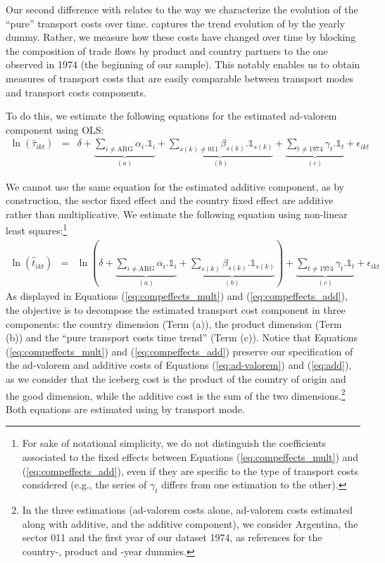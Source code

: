 \documentclass[a4paper,11pt]{article}
\begin{document}
Our second difference with \citet{hummels2007} relates to the way we characterize the evolution of the ``pure'' transport costs over time. \citet{hummels2007} captures the trend evolution of by the yearly dummy. Rather, we measure how these costs have changed over time by blocking the composition of trade flows by product and country partners to the one observed in 1974 (the beginning of our sample). This notably enables us to obtain measures of transport costs that are easily comparable between transport modes and transport costs components.

To do this, we estimate the following equations for the estimated ad-valorem component using OLS:
\begin{eqnarray}
\ln(\widehat{\tau}_{ikt})&=&\delta +\underbrace{\sum_{i \neq \text{ARG}}\alpha_i.\mathbb{1}_i}_{(a)} + \underbrace{\sum_{s(k)\neq \text{011}}\beta_{s(k)}.\mathbb{1}_{s(k)}}_{(b)} + \underbrace{\sum_{t \neq 1974}\gamma_t.\mathbb{1}_t}_{(c)}+\epsilon_{ikt} \label{eq:compeffects_mult}
\end{eqnarray}

We cannot use the same equation for the estimated additive component, as by construction, the sector fixed effect and the country fixed effect are additive rather than multiplicative. We estimate the following equation using non-linear least squares:\footnote{For sake of notational simplicity, we do not distinguish the coefficients associated to the fixed effects between Equations (\ref{eq:compeffects_mult}) and (\ref{eq:compeffects_add}), even if they are specific to the type of transport costs considered (e.g., the series of $\gamma_t$ differs from one estimation to the other).}
\begin{eqnarray}
\ln(\widehat{t}_{ikt})&=&\ln\left( \delta + \underbrace{\sum_{i \neq \text{ARG}}  \alpha_i.\mathbb{1}_i}_{(a)}+\underbrace{\sum_{s(k)}\beta_{s(k)}.\mathbb{1}_{s(k)}}_{(b)}\right) + \underbrace{\sum_{t \neq 1974}\gamma_t.\mathbb{1}_t}_{(c)}+\epsilon_{ikt} \label{eq:compeffects_add}
\end{eqnarray}
As displayed in Equations (\ref{eq:compeffects_mult}) and (\ref{eq:compeffects_add}), the objective is to decompose the estimated transport cost component in three components: the country dimension (Term (a)), the product dimension (Term (b)) and the ``pure transport costs time trend'' (Term (c)). Notice that Equations (\ref{eq:compeffects_mult}) and (\ref{eq:compeffects_add}) preserve our specification of the ad-valorem and additive costs of Equations (\ref{eq:ad-valorem}) and (\ref{eq:add}), as we consider that the iceberg cost is the product of the country of origin and the good dimension, while the additive cost is the sum of the two dimensions.\footnote{In the three estimations (ad-valorem costs alone, ad-valorem costs estimated along with additive, and the additive component), we consider Argentina, the sector 011 and the first year of our dataset 1974, as references for the country-, product and -year dummies.} Both equations are estimated using by transport mode.
\end{document}
